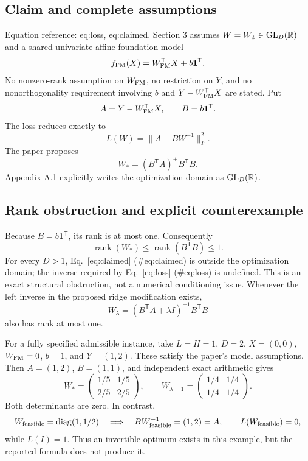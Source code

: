 \documentclass[10pt]{article}
\begin{document}
\subsection*{Claim and complete assumptions}
Equation reference: eq:loss, eq:claimed. Section 3 assumes \(W=W_\phi\in {\rm GL}_D(\mathbb R)\) and a shared univariate affine foundation model \[f_{\rm FM}(X)=W_{\rm FM}^{\mathsf T}X+b\mathbf1^{\mathsf T}.\] No nonzero-rank assumption on \(W_{\rm FM}\), no restriction on \(Y\), and no nonorthogonality requirement involving \(b\) and \(Y-W_{\rm FM}^{\mathsf T}X\) are stated. Put \[A=Y-W_{\rm FM}^{\mathsf T}X,\qquad B=b\mathbf1^{\mathsf T}.\] The loss reduces exactly to \[L(W)=\|A-BW^{-1}\|_F^2.
 \] The paper proposes \[W_*=(B^{\mathsf T}A)^+B^{\mathsf T}B.
 \] Appendix A.1 explicitly writes the optimization domain as \({\rm GL}_D(\mathbb R)\).\par
\subsection*{Rank obstruction and explicit counterexample}
Because \(B=b\mathbf1^{\mathsf T}\), its rank is at most one. Consequently \[\operatorname{rank}(W_*)\leq
 \operatorname{rank}(B^{\mathsf T}B)\leq1.\] For every \(D>1\), Eq. [eq:claimed] (\#eq:claimed) is outside the optimization domain; the inverse required by Eq. [eq:loss] (\#eq:loss) is undefined. This is an exact structural obstruction, not a numerical conditioning issue. Whenever the left inverse in the proposed ridge modification exists, \[W_\lambda=(B^{\mathsf T}A+\lambda I)^{-1}B^{\mathsf T}B\] also has rank at most one.\par
For a fully specified admissible instance, take \(L=H=1\), \(D=2\), \(X=(0,0)\), \(W_{\rm FM}=0\), \(b=1\), and \(Y=(1,2)\). These satisfy the paper’s model assumptions. Then \(A=(1,2)\), \(B=(1,1)\), and independent exact arithmetic gives \[W_*=\begin{pmatrix}1/5&1/5\\2/5&2/5\end{pmatrix},
 \qquad
 W_{\lambda=1}=\begin{pmatrix}1/4&1/4\\1/4&1/4\end{pmatrix}.\] Both determinants are zero. In contrast, \[W_{\rm feasible}=\operatorname{diag}(1,1/2)
 \quad\Longrightarrow\quad
 BW_{\rm feasible}^{-1}=(1,2)=A,\qquad L(W_{\rm feasible})=0,\] while \(L(I)=1\). Thus an invertible optimum exists in this example, but the reported formula does not produce it.\par
\end{document}
